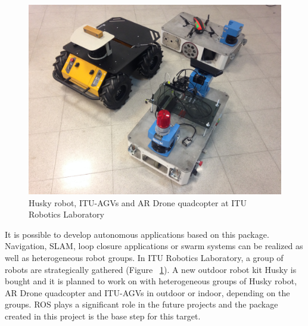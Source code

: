 	\begin{figure}
		\centering
		\includegraphics[scale=0.11]{images/husky}
		\caption{Husky robot, ITU-AGVs and AR Drone quadcopter at ITU Robotics Laboratory}
		\label{fig:husky}
	\end{figure}
\par
It is possible to develop autonomous applications based on this package. Navigation, SLAM, loop closure applications or swarm systems can be realized as well as heterogeneous robot groups. In ITU Robotics Laboratory, a group of robots are strategically gathered (Figure ~\ref{fig:husky}). A new outdoor robot kit Husky is bought and it is planned to work on with heterogeneous groups of Husky robot, AR Drone quadcopter and ITU-AGVs in outdoor or indoor, depending on the groups. ROS plays a significant role in the future projects and the package created in this project is the base step for this target. 
